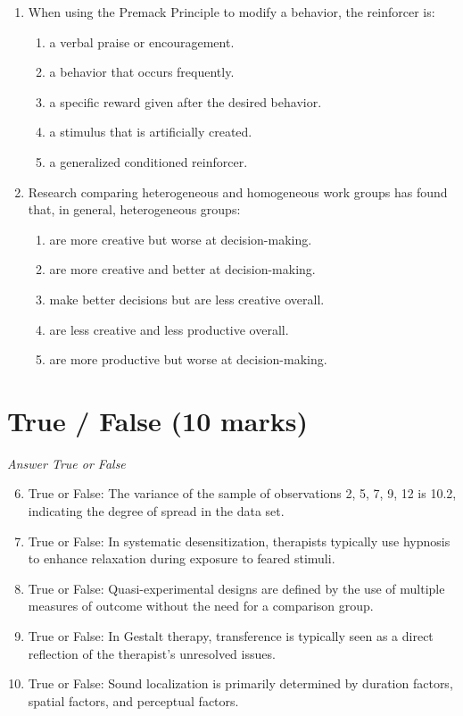 \documentclass[12pt]{article}
\begin{document}
\begin{enumerate}[label=\arabic*.]
\begin{enumerate}[label=(\alph*)]
    \item identifying the strengths and weaknesses of the consultee's current approach
\end{enumerate}
\item When using the Premack Principle to modify a behavior, the reinforcer is:
\begin{enumerate}[label=(\alph*)]
    \item a verbal praise or encouragement.
    \item a behavior that occurs frequently.
    \item a specific reward given after the desired behavior.
    \item a stimulus that is artificially created.
    \item a generalized conditioned reinforcer.
\end{enumerate}
\item Research comparing heterogeneous and homogeneous work groups has found that, in general, heterogeneous groups:
\begin{enumerate}[label=(\alph*)]
    \item are more creative but worse at decision-making.
    \item are more creative and better at decision-making.
    \item make better decisions but are less creative overall.
    \item are less creative and less productive overall.
    \item are more productive but worse at decision-making.
\end{enumerate}
\end{enumerate}

\section*{True / False (10 marks)}
\textit{Answer True or False}
\begin{enumerate}[label=\arabic*.]
\setcounter{enumi}{5}
\item True or False: The variance of the sample of observations 2, 5, 7, 9, 12 is 10.2, indicating the degree of spread in the data set.
\item True or False: In systematic desensitization, therapists typically use hypnosis to enhance relaxation during exposure to feared stimuli.
\item True or False: Quasi-experimental designs are defined by the use of multiple measures of outcome without the need for a comparison group.
\item True or False: In Gestalt therapy, transference is typically seen as a direct reflection of the therapist's unresolved issues.
\item True or False: Sound localization is primarily determined by duration factors, spatial factors, and perceptual factors.
\end{enumerate}
\end{document}
